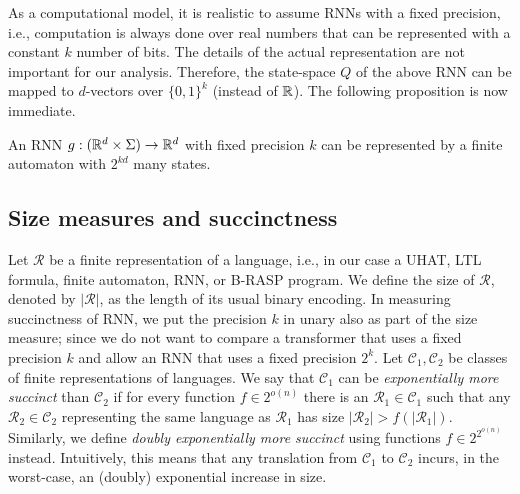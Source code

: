 As a computational model, it is realistic to assume RNNs with a fixed precision,
i.e., computation is always done over real numbers that can be represented with
a constant $k$ number of bits. The details of the actual representation are 
not important for our analysis. Therefore, the state-space $Q$ of the above 
RNN can be mapped to $d$-vectors over $\{0,1\}^k$ (instead of $\mathbb{R}$). The
following proposition is now immediate.
\begin{proposition}
    An RNN $g: (\mathbb{R}^d \times \Sigma) \to \mathbb{R}^d$ with fixed precision $k$
    can be represented by a finite automaton with $2^{kd}$ many states.
    \label{prop:rnn-dfa}
\end{proposition}

\subsection{Size measures and succinctness}
Let $\mathcal{R}$ be a finite representation of a language, i.e., 
in our case a UHAT, LTL formula, finite automaton, RNN, or B-RASP program.
We define the size of $\mathcal{R}$, denoted by $|\mathcal{R}|$, as the length of its usual binary encoding.
In measuring succinctness of RNN, we put the precision $k$ in unary also as part of the 
size measure; since we do not want to compare a transformer that uses a
fixed precision $k$ and allow an RNN that uses a fixed precision $2^k$.
Let $\mathcal{C}_1, \mathcal{C}_2$ be classes of finite representations of languages.
We say that $\mathcal{C}_1$ can be \emph{exponentially more succinct} than $\mathcal{C}_2$ if
for every function $f \in 2^{o(n)}$ 
there is an $\mathcal{R}_1 \in \mathcal{C}_1$ such that
any $\mathcal{R}_2 \in \mathcal{C}_2$ representing the same language as $\mathcal{R}_1$ has size
$|\mathcal{R}_2| > f(|\mathcal{R}_1|)$.
Similarly, we define \emph{doubly exponentially more succinct} using functions $f \in 2^{2^{o(n)}}$ instead.
Intuitively, this means that any translation from $\mathcal{C}_1$ to $\mathcal{C}_2$ incurs, in the worst-case, 
an (doubly) exponential increase in size.
